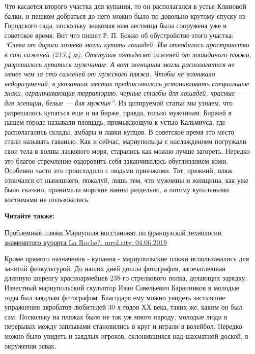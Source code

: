 Что касается второго участка для купания, то он располагался в устье Клиновой
балки, и пешком добраться до него можно было по довольно крутому спуску из
Городского сада, поскольку знакомая нам лестница была сооружена уже в советское
время. Вот что пишет Р. П. Божко об обустройстве этого участка: \emph{\enquote{Слева от дороги
хозяева могли купать лошадей. Им отводилось пространство в сто саженей (213,4
м). Отступая пятьдесят саженей от лошадиного пляжа, разрешалось купаться
мужчинам. А вот женщины могли располагаться не менее чем за сто саженей от
мужского пляжа. Чтобы не возникало недоразумений, в указанных местах
предписывалось устанавливать специальные знаки, ограничивающие территорию:
черные столбы для лошадей, красные — для женщин, белые — для мужчин}}. Из
цитируемой статьи мы узнаем, что разрешалось купаться еще и на бирже, правда,
только мужчинам. Биржей в нашем городе называли площадь, примыкающую к устью
Кальмиуса, где располагались склады, амбары и лавки купцов. В советское время
это место стали называть гаванью. Как и сейчас, мариупольцы с наслаждением
погружали свои тела в волны ласкового моря, старались как можно лучше загореть.
Нередко это благое стремление оздоровить себя заканчивалось обугливанием кожи.
Особенно часто это происходило с людьми приезжими. Тот, прежний, пляж отличался
от нынешнего, пожалуй, лишь тем, что мужчины и женщины, как уже было сказано,
принимали морские ванны раздельно, а потому купальными костюмами не
пользовались.

\textbf{Читайте также:} 

\href{https://mrpl.city/news/view/problemnye-plyazhi-mariupolya-vosstanovyat-po-frantsuzskoj-tehnologii-znamenitogo-kurorta-la-roche}{%
Проблемные пляжи Мариуполя восстановят по французской технологии знаменитого курорта La Roche?, mrpl.city, 04.06.2019}

Кроме прямого назначения - купания - мариупольские пляжи использовались для
занятий физкультурой. До наших дней дошла фотография, запечатлевшая длинную
шеренгу красноармейцев 238-го стрелкового полка, делающих зарядку. Известный
мариупольский скульптор Иван Савельевич Баранников в молодые годы был заядлым
фотографом. Благодаря ему можно увидеть застывшие упражнения
акробатов-любителей 30-х годов ХХ века, таких же, каким он был сам. Поскольку
на пляжах было не так уж много народу, молодые люди в перерывах между заплывами
становились в круг и играли в волейбол. Нередко можно было увидеть и заядлых
игроков, склонившихся над шахматной доской, в окружении зевак.

